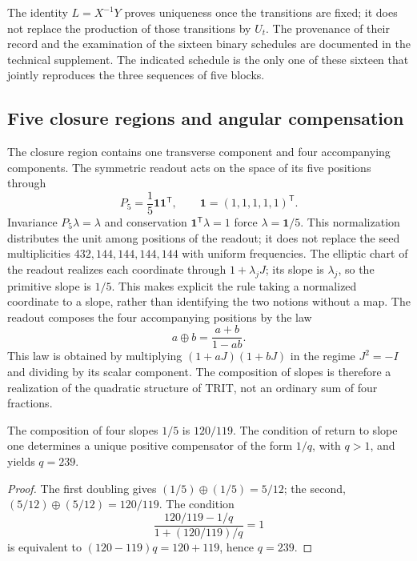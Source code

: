 The identity \(L=X^{-1}Y\) proves uniqueness once the transitions are fixed; it does not replace the production of those transitions by \(U_t\). The provenance of their record and the examination of the sixteen binary schedules are documented in the technical supplement. The indicated schedule is the only one of these sixteen that jointly reproduces the three sequences of five blocks.

\subsection{Five closure regions and angular compensation}

The closure region contains one transverse component and four accompanying components. The symmetric readout acts on the space of its five positions through
\[
 P_5=\frac15\mathbf1\mathbf1^{\mathsf T},\qquad
 \mathbf1=(1,1,1,1,1)^{\mathsf T}.
\]
Invariance \(P_5\lambda=\lambda\) and conservation \(\mathbf1^{\mathsf T}\lambda=1\) force \(\lambda=\mathbf1/5\). This normalization distributes the unit among positions of the readout; it does not replace the seed multiplicities \(432,144,144,144,144\) with uniform frequencies. The elliptic chart of the readout realizes each coordinate through \(1+\lambda_jJ\); its slope is \(\lambda_j\), so the primitive slope is \(1/5\). This makes explicit the rule taking a normalized coordinate to a slope, rather than identifying the two notions without a map. The readout composes the four accompanying positions by the law
\begin{equation}
 a\oplus b=\frac{a+b}{1-ab}.
 \label{eq:suma-pendientes}
\end{equation}
This law is obtained by multiplying \((1+aJ)(1+bJ)\) in the regime \(J^2=-I\) and dividing by its scalar component. The composition of slopes is therefore a realization of the quadratic structure of TRIT, not an ordinary sum of four fractions.

\begin{proposition}
The composition of four slopes \(1/5\) is \(120/119\). The condition of return to slope one determines a unique positive compensator of the form \(1/q\), with \(q>1\), and yields \(q=239\).
\end{proposition}
\begin{proof}
The first doubling gives \((1/5)\oplus(1/5)=5/12\); the second, \((5/12)\oplus(5/12)=120/119\). The condition
\[
 \frac{120/119-1/q}{1+(120/119)/q}=1
\]
is equivalent to \((120-119)q=120+119\), hence \(q=239\).
\end{proof}


